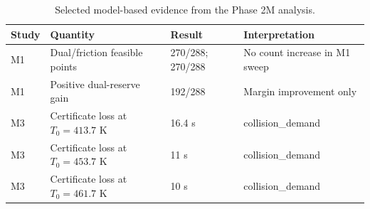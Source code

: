 \begin{table}[!t]
\centering
\caption{Selected model-based evidence from the Phase 2M analysis.}
\label{tab:final-model-evidence}
\normalsize
\begin{tabular}{@{}lp{}lp{}@{}}
\toprule
Study & Quantity & Result & Interpretation \\
\midrule
M1 & Dual/friction feasible points & 270/288; 270/288 & No count increase in M1 sweep \\
M1 & Positive dual-reserve gain & 192/288 & Margin improvement only \\
M3 & Certificate loss at $T_0=413.7$ K & 16.4 s & collision\_demand \\
M3 & Certificate loss at $T_0=453.7$ K & 11 s & collision\_demand \\
M3 & Certificate loss at $T_0=461.7$ K & 10 s & collision\_demand \\
\bottomrule
\end{tabular}
\end{table}
